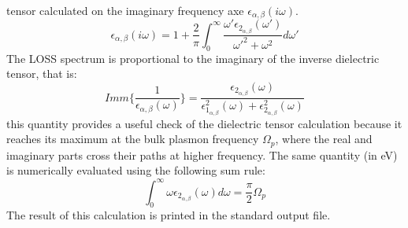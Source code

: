 \documentclass[twocolumn]{article}
\begin{document}
tensor calculated on the imaginary frequency axe $\epsilon_{\alpha,\beta}(i\omega)$. 
\begin{equation}
\epsilon_{\alpha,\beta}(i\omega)=1+\frac{2}{\pi}\int_{0}^{\infty}\frac{\omega' \epsilon_{2_{\alpha,\beta}}(\omega')}
{\omega'^{2}+\omega^{2}}d\omega'
\end{equation}
The LOSS spectrum is proportional to the imaginary of the inverse dielectric tensor, that is:
\begin{equation}
Imm\Bigg\{\frac{1}{\epsilon_{\alpha,\beta}(\omega)}\Bigg\}=
\frac{\epsilon_{2_{\alpha,\beta}}(\omega)}{\epsilon_{1_{\alpha,\beta}}^{2}(\omega)+
\epsilon_{2_{\alpha,\beta}}^{2}(\omega)}
\end{equation}
this quantity provides a useful check of the dielectric tensor calculation because it reaches its maximum at the bulk plasmon
frequency $\Omega_{p}$, where the real and imaginary parts cross their paths at higher frequency. The same quantity (in eV)
is numerically evaluated using the following sum rule:
\begin{equation}
\int_{0}^{\infty}\omega\epsilon_{2_{\alpha,\beta}}(\omega)d\omega=\frac{\pi}{2}\Omega_{p}
\end{equation}  
The result of this calculation is printed in the standard output file.
\end{document}
